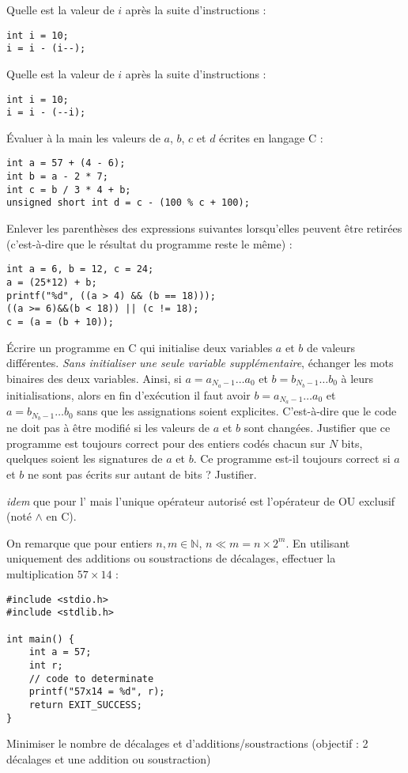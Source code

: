 \documentclass[../../../main.tex]{subfiles}
\begin{document}
Quelle est la valeur de $i$ après la suite d'instructions :
\begin{verbatim}
int i = 10;
i = i - (i--);
\end{verbatim}
Quelle est la valeur de $i$ après la suite d'instructions :
\begin{verbatim}
int i = 10;
i = i - (--i);
\end{verbatim}
\newline
Évaluer à la main les valeurs de $a$, $b$, $c$ et $d$ écrites en langage C :
\begin{verbatim}
int a = 57 + (4 - 6);
int b = a - 2 * 7;
int c = b / 3 * 4 + b;
unsigned short int d = c - (100 % c + 100);
\end{verbatim}
Enlever les parenthèses des expressions suivantes lorsqu'elles peuvent être retirées (c'est-à-dire que le résultat du programme reste le même) :
\begin{verbatim}
int a = 6, b = 12, c = 24;
a = (25*12) + b;
printf("%d", ((a > 4) && (b == 18)));
((a >= 6)&&(b < 18)) || (c != 18);
c = (a = (b + 10));
\end{verbatim}
 Écrire un programme en C qui initialise deux variables $a$ et $b$ de valeurs différentes. \textit{Sans initialiser une seule variable supplémentaire}, échanger les mots binaires des deux variables. Ainsi, si $a = a_{N_{a}-1}\dots{a_{0}}$ et $b = b_{N_{b}-1}\dots{b_{0}}$ à leurs initialisations, alors en fin d'exécution il faut avoir $b = a_{N_{a}-1}\dots{a_{0}}$ et $a = b_{N_{b}-1}\dots{b_{0}}$ sans que les assignations soient explicites. C'est-à-dire que le code ne doit pas à être modifié si les valeurs de $a$ et $b$ sont changées.\newline
Justifier que ce programme est toujours correct pour des entiers codés chacun sur $N$ bits, quelques soient les signatures de $a$ et $b$. Ce programme est-il toujours correct si $a$ et $b$ ne sont pas écrits sur autant de bits ? Justifier.
 
 \textit{idem} que pour l' mais l'unique opérateur autorisé est l'opérateur de OU exclusif (noté $\wedge$ en C).
 
\newline
On remarque que pour entiers $n, m\in{\mathbb{N}}$, $n\ll{m} = n\times2^{m}$. En utilisant uniquement des additions ou soustractions de décalages, effectuer la multiplication $57\times{14}$ :
\begin{verbatim}
#include <stdio.h>
#include <stdlib.h>

int main() {
	int a = 57;
	int r;
	// code to determinate
	printf("57x14 = %d", r);
	return EXIT_SUCCESS;
}
\end{verbatim}
Minimiser le nombre de décalages et d'additions/soustractions (objectif : 2 décalages et une addition ou soustraction)
 
\end{document}
